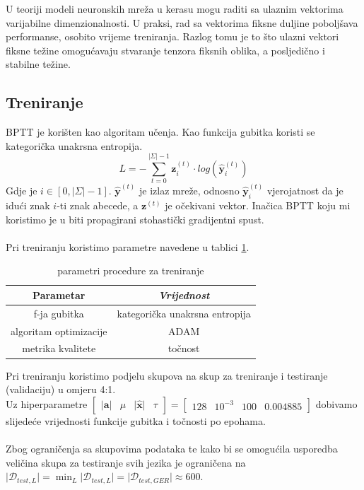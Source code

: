 \documentclass[conference]{IEEEtran}
\begin{document}
U teoriji modeli neuronskih mreža u kerasu mogu raditi sa ulaznim vektorima varijabilne dimenzionalnosti. U praksi, rad sa vektorima fiksne duljine poboljšava performanse, osobito vrijeme treniranja. Razlog tomu je to što ulazni vektori fiksne težine omogućavaju stvaranje tenzora fiksnih oblika, a posljedično i stabilne težine.\\



\subsection{Treniranje} \label{subsect:trening}
BPTT je korišten kao algoritam učenja.
Kao funkcija gubitka koristi se kategorička unakrsna entropija.
\begin{equation}
L = - \sum_{t = 0}^{\lvert \Sigma \rvert-1} \mathbf{z}_i^{(t)} \cdot log(\hat{\mathbf{y}}_i^{(t)})
\end{equation}
Gdje je $i \in [0, \lvert \Sigma \rvert - 1]$. $\hat{\mathbf{y}}^{(t)}$ je izlaz mreže, odnosno $\hat{\mathbf{y}}_i^{(t)}$ vjerojatnost da je idući znak $i$-ti znak abecede, a $\mathbf{z}^{(t)}$ je očekivani vektor.
Inačica BPTT koju mi koristimo je u biti propagirani stohastički gradijentni spust.\\
\\
Pri treniranju koristimo parametre navedene u tablici \ref{tab:trening}.
\begin{table}[htbp]
\caption{parametri procedure za treniranje}
\begin{center}
\begin{tabular}{|c|c|}
\hline
\textbf{Parametar} & \textbf{\textit{Vrijednost}}\\ \hline
f-ja gubitka & kategorička unakrsna entropija \\ \hline
algoritam optimizacije & ADAM \\ \hline
metrika kvalitete & točnost \\ \hline
\end{tabular}
\label{tab:trening}
\end{center}
\end{table}

Pri treniranju koristimo podjelu skupova na skup za treniranje i testiranje (validaciju) u omjeru 4:1.\\
Uz hiperparametre $\begin{bmatrix} \lvert \mathbf{a} \rvert & \mu & \lvert \mathbf{\hat{x}} \rvert & \tau \end{bmatrix} = \begin{bmatrix} 128 & 10^{-3} & 100 & 0.004885  \end{bmatrix}$ dobivamo slijedeće vrijednosti funkcije gubitka i točnosti po epohama.\\
\\
Zbog ograničenja sa skupovima podataka te kako bi se omogućila usporedba veličina skupa za testiranje svih jezika je ograničena na $\lvert \mathcal{D}_{test, L} \rvert = \min_{L} \lvert \mathcal{D}_{test, L} \rvert = \lvert \mathcal{D}_{test, GER} \rvert \approx 600$.
\end{document}
